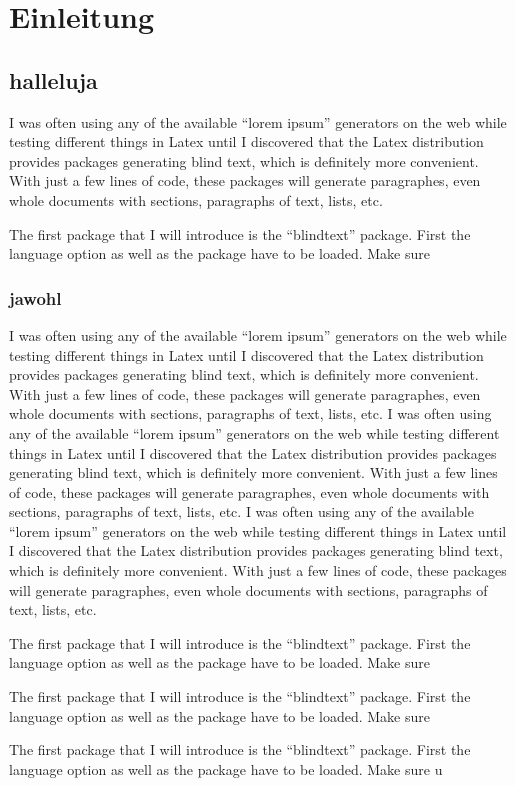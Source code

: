 \chapter{Einleitung}
\section{halleluja}
I was often using any of the available “lorem ipsum” generators on the web while testing different things in Latex until I discovered that the Latex distribution provides packages generating blind text, which is definitely more convenient. With just a few lines of code, these packages will generate paragraphes, even whole documents with sections, paragraphs of text, lists, etc.

The first package that I will introduce is the “blindtext” package. First the language option as well as the package have to be loaded. Make sure

\subsection{jawohl}
I was often using any of the available “lorem ipsum” generators on the web while testing different things in Latex until I discovered that the Latex distribution provides packages generating blind text, which is definitely more convenient. With just a few lines of code, these packages will generate paragraphes, even whole documents with sections, paragraphs of text, lists, etc.
I was often using any of the available “lorem ipsum” generators on the web while testing different things in Latex until I discovered that the Latex distribution provides packages generating blind text, which is definitely more convenient. With just a few lines of code, these packages will generate paragraphes, even whole documents with sections, paragraphs of text, lists, etc.
I was often using any of the available “lorem ipsum” generators on the web while testing different things in Latex until I discovered that the Latex distribution provides packages generating blind text, which is definitely more convenient. With just a few lines of code, these packages will generate paragraphes, even whole documents with sections, paragraphs of text, lists, etc.

The first package that I will introduce is the “blindtext” package. First the language option as well as the package have to be loaded. Make sure

The first package that I will introduce is the “blindtext” package. First the language option as well as the package have to be loaded. Make sure

The first package that I will introduce is the “blindtext” package. First the language option as well as the package have to be loaded. Make sure
u
